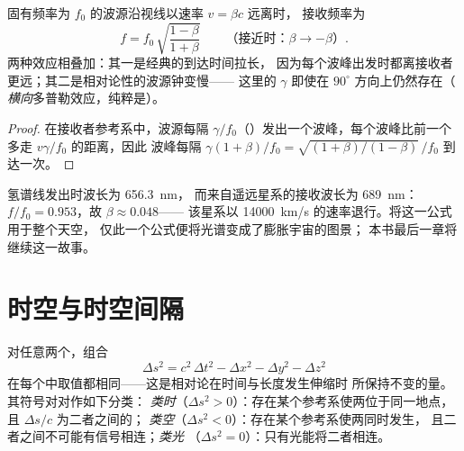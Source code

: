 \begin{proposition}[纵向多普勒效应]\label{prop:b3:relativistic-kinematics:doppler}
固有频率为 $f_0$ 的波源沿视线以速率 $v = \beta c$ 远离时，
接收频率为
\[
f = f_0\,\sqrt{\frac{1 - \beta}{1 + \beta}}
\qquad
\text{（接近时：} \beta \to -\beta\text{）} .
\]
两种效应相叠加：其一是经典的到达时间拉长，
因为每个波峰出发时都离接收者更远；其二是相对论性的波源钟变慢——
这里的 $\gamma$ 即使在 $90^\circ$ 方向上仍然存在（
\emph{横向}多普勒效应，纯粹是）。
\end{proposition}

\begin{proof}
在接收者参考系中，波源每隔
$\gamma/f_0$（）发出一个波峰，每个波峰比前一个多走 $v\gamma/f_0$ 的距离，因此
波峰每隔 $\gamma(1 + \beta)/f_0 = \sqrt{(1+\beta)/
(1-\beta)}\,/f_0$ 到达一次。
\end{proof}

\begin{example}[星系的退行]\label{ex:b3:relativistic-kinematics:redshift}
氢谱线发出时波长为 \qty{656.3}{nm}，
而来自遥远星系的接收波长为 \qty{689}{nm}：$f/f_0 = 0.953$，故 $\beta \approx 0.048$——
该星系以 \qty{14000}{km/s} 的速率退行。将这一公式用于整个天空，
仅此一个公式便将光谱变成了膨胀宇宙的图景；
本书最后一章将继续这一故事。
\end{example}

\section{时空与时空间隔}

\begin{theorem}[不变时空间隔]\label{thm:b3:relativistic-kinematics:interval}
对任意两个，组合
\[
\Delta s^2 = c^2\,\Delta t^2 - \Delta x^2 - \Delta y^2 - \Delta z^2
\]
在每个中取值都相同——这是相对论在时间与长度发生伸缩时
所保持不变的量。其符号对对作如下分类：
\emph{类时}（$\Delta s^2 > 0$）：存在某个参考系使两位于同一地点，
且 $\Delta s/c$ 为二者之间的；
\emph{类空}（$\Delta s^2 < 0$）：存在某个参考系使两同时发生，
且二者之间不可能有信号相连；\emph{类光}
（$\Delta s^2 = 0$）：只有光能将二者相连。
\end{theorem}

